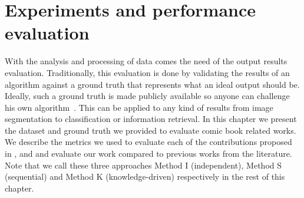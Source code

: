 \chapter{Experiments and performance evaluation}
\label{chap:experimentations}
\graphicspath{{./chapters/6-experiments/figs/}}



With the analysis and processing of data comes the need of the output results evaluation.
Traditionally, this evaluation is done by validating the results of an algorithm against a ground truth that represents what an ideal output should be\cite{pascal-voc-2012, smeaton2006evaluation, griffinHolubPerona}.
Ideally, such a ground truth is made publicly available so anyone can challenge his own algorithm~\cite{lamiroy:inria-00537035}.
This can be applied to any kind of results from image segmentation to classification or information retrieval.
In this chapter we present the dataset and ground truth we provided to evaluate comic book related works.
We describe the metrics we used to evaluate each of the contributions proposed in ,  and  and evaluate our work compared to previous works from the literature.
Note that we call these three approaches Method I (independent), Method S (sequential) and Method K (knowledge-driven) respectively in the rest of this chapter.






